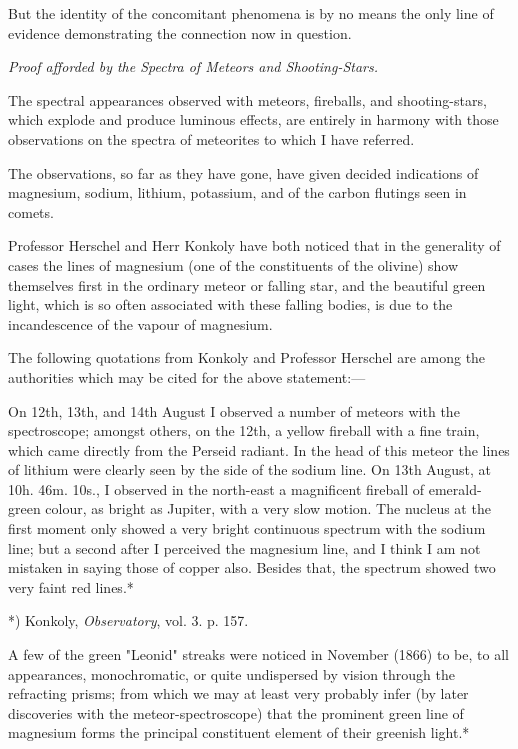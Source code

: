 \documentclass[a4paper, 12pt, oneside, polutonikogreek, english]{article}
\begin{document}
But the identity of the concomitant phenomena is by no means the only line of evidence demonstrating the connection now in question.

\emph{Proof afforded by the Spectra of Meteors and Shooting-Stars.}

The spectral appearances observed with meteors, fireballs, and shooting-stars, which explode and produce luminous effects, are entirely in harmony with those observations on the spectra of meteorites to which I have referred.

The observations, so far as they have gone, have given decided indications of magnesium, sodium, lithium, potassium, and of the carbon flutings seen in comets.

Professor Herschel and Herr Konkoly have both noticed that in the generality of cases the lines of magnesium (one of the constituents of the olivine) show themselves first in the ordinary meteor or falling star, and the beautiful green light, which is so often associated with these falling bodies, is due to the incandescence of the vapour of magnesium.

The following quotations from Konkoly and Professor Herschel are among the authorities which may be cited for the above statement:---

On 12th, 13th, and 14th August I observed a number of meteors with the spectroscope; amongst others, on the 12th, a yellow fireball with a fine train, which came directly from the Perseid radiant. In the head of this meteor the lines of lithium were clearly seen by the side of the sodium line. On 13th August, at 10h. 46m. 10s., I observed in the north-east a magnificent fireball of emerald-green colour, as bright as Jupiter, with a very slow motion. The nucleus at the first moment only showed a very bright continuous spectrum with the sodium line; but a second after I perceived the magnesium line, and I think I am not mistaken in saying those of copper also. Besides that, the spectrum showed two very faint red lines.*

*) Konkoly, \emph{Observatory}, vol. 3. p. 157.

A few of the green "Leonid" streaks were noticed in November (1866) to be, to all appearances, monochromatic, or quite undispersed by vision through the refracting prisms; from which we may at least very probably infer (by later discoveries with the meteor-spectroscope) that the prominent green line of magnesium forms the principal constituent element of their greenish light.*
\end{document}
